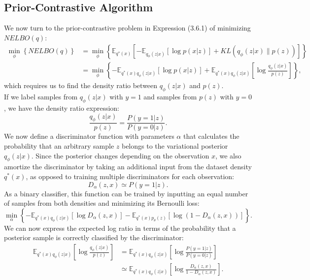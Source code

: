 \documentclass[honours,12pt, twoside]{unswthesis}
\newcommand{\E}{\mathbb{E}}
\numberwithin{equation}{section}
\theoremstyle{definition}
\begin{document}
\subsection{Prior-Contrastive Algorithm}\label{sec:4.1.2}
We now turn to the prior-contrastive problem in Expression (3.6.1) of minimizing $NELBO(q)$:
\begin{align}
\min_{\phi} \left\lbrace NELBO(q)\right\rbrace&=\min_{\phi}\left\lbrace\mathbb{E}_{q^*(x)}\left[-\E_{q_\phi(z|x)}[\log p(x|z)]+KL(q_\phi(z|x)\|p(z))\right]\right\rbrace\nonumber\\
&=\min_\phi \left\lbrace-\mathbb{E}_{q^*(x)q_\phi(z|x)}[\log p(x|z)]+\mathbb{E}_{q^*(x)q_\phi(z|x)}\left[\log \frac{q_\phi(z|x)}{p(z)}\right]\right\rbrace,
\end{align}
which requires us to find the density ratio between $q_\phi(z|x)$ and $p(z)$.\\
If we label samples from $q_\phi(z|x)$ with $y=1$ and samples from $p(z)$ with $y=0$, we have the density ratio expression:
\[\frac{q_\phi(z|x)}{p(z)}=\frac{P(y=1|z)}{P(y=0|z)}.\]
We now define a discriminator function with parameters $\alpha$ that calculates the probability that an arbitrary sample $z$ belongs to the variational posterior $q_\phi(z|x)$. Since the posterior changes depending on the observation $x$, we also amortize the discriminator by taking an additional input from the dataset density $q^*(x)$, as opposed to training multiple discriminators for each observation:
\[D_\alpha(z,x)\simeq P(y=1|z).\]
As a binary classifier, this function can be trained by inputting an equal number of samples from both densities and minimizing its Bernoulli loss:
\begin{equation}
\min_\alpha \left\lbrace-\mathbb{E}_{q^*(x)q_\phi(z|x)}[\log D_\alpha(z,x)]-\mathbb{E}_{q^*(x)p_\theta(z)}[\log (1-D_\alpha(z,x))]\right\rbrace.
\end{equation}
We can now express the expected log ratio in terms of the probability that a posterior sample is correctly classified by the discriminator:
\begin{align*}
\mathbb{E}_{q^*(x)q_\phi(z|x)}\left[\log \frac{q_\phi(z|x)}{p(z)}\right]&=\mathbb{E}_{q^*(x)q_\phi(z|x)}\left[\log \frac{P(y=1|z)}{P(y=0|z)}\right]\\
&\simeq \mathbb{E}_{q^*(x)q_\phi(z|x)}\left[\log \frac{D_\alpha(z,x)}{1-D_\alpha(z,x)}\right].
\end{align*}
\end{document}
